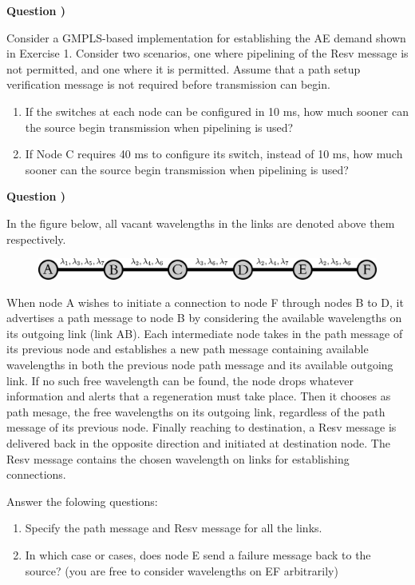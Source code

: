 \documentclass[a4paper]{article}
\newcounter{QuestionNumber}
\newcommand{\Q}{
\textbf{Question \theQuestionNumber)}
\stepcounter{QuestionNumber}
}
\begin{document}
\Q

Consider a GMPLS-based implementation for establishing the AE demand
shown in Exercise 1. Consider two scenarios, one where pipelining of the
Resv message is not permitted, and one where it is permitted. Assume that a
path setup verification message is not required before transmission can begin.
\begin{enumerate}[label=\alph*-]
\item
If the switches at each node can be configured in 10 ms, how much sooner
can the source begin transmission when pipelining is used?
\item
If Node C
requires 40 ms to configure its switch, instead of 10 ms, how much sooner can
the source begin transmission when pipelining is used?
\end{enumerate}

\Q

In the figure below, all vacant wavelengths in the links are denoted above them respectively. 
\begin{figure}[tbh!]
\centering
\includegraphics[scale=0.15]{lambda_bus.eps}
\label{fig:Q5}
\end{figure}

When node A wishes to initiate a connection to node F through nodes B to D, it advertises a path message to node B by considering the available wavelengths on its outgoing link (link AB). Each intermediate node takes in the path message of its previous node and establishes a new path message containing available wavelengths in both the previous node path message and its available outgoing link. If no such free wavelength can be found, the node drops whatever information and alerts that a regeneration must take place. Then it chooses as path mesage, the free wavelengths on its outgoing link, regardless of the path message of its previous node. Finally reaching to destination, a Resv message is delivered back in the opposite direction and initiated at destination node. The Resv message contains the chosen wavelength on links for establishing connections.

Answer the folowing questions:
\begin{enumerate}[label=\alph*-]
\item
Specify the path message and Resv message for all the links.
\item 
In which case or cases, does node E send a failure message back to the source? (you are free to consider wavelengths on EF arbitrarily)  
\end{enumerate}




\end{document}
